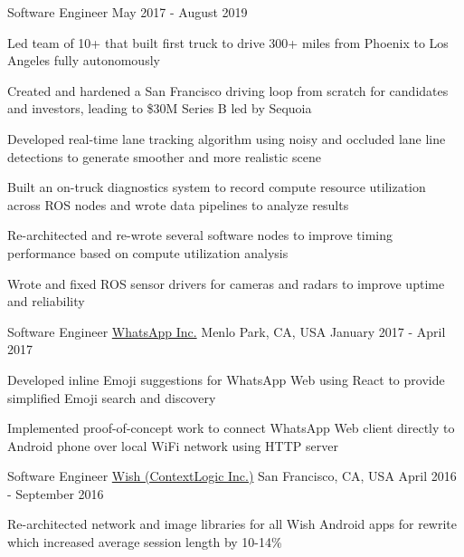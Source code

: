 \begin{center}
  \cvsubentry
    {Software Engineer}
    {May 2017 - August 2019}
    {
      \begin{cvitems}
        \item {Led team of 10+ that built first truck to drive 300+ miles from Phoenix to Los Angeles fully autonomously}
        \item {Created and hardened a San Francisco driving loop from scratch for candidates and investors, leading to \$30M Series B led by Sequoia}
        \item {Developed real-time lane tracking algorithm using noisy and occluded lane line detections to generate smoother and more realistic scene}
        \item {Built an on-truck diagnostics system to record compute resource utilization across ROS nodes and wrote data pipelines to analyze results}
        \item {Re-architected and re-wrote several software nodes to improve timing performance based on compute utilization analysis}
        \item {Wrote and fixed ROS sensor drivers for cameras and radars to improve uptime and reliability}
      \end{cvitems} 
    }
\end{center}
\begin{center}
  \vspace{-2.7mm}
  \cventry
    {Software Engineer}
    {\href{https://web.whatsapp.com/}{WhatsApp Inc.}}
    {Menlo Park, CA, USA}
    {January 2017 - April 2017}
    {
      \begin{cvitems}
        \item {Developed inline Emoji suggestions for WhatsApp Web using React to provide simplified Emoji search and discovery}
        \item {Implemented proof-of-concept work to connect WhatsApp Web client directly to Android phone over local WiFi network using HTTP server}
      \end{cvitems}
    }
\end{center}
\begin{center}
  \vspace{-2.7mm}
  \cventry
    {Software Engineer}
    {\href{https://wish.com/mobile-apps}{Wish (ContextLogic Inc.)}}
    {San Francisco, CA, USA}
    {April 2016 - September 2016}
    {
      \begin{cvitems}
        \item {Re-architected network and image libraries for all Wish Android apps for rewrite which increased average session length by 10-14\%}
      \end{cvitems}
    }
\end{center}
